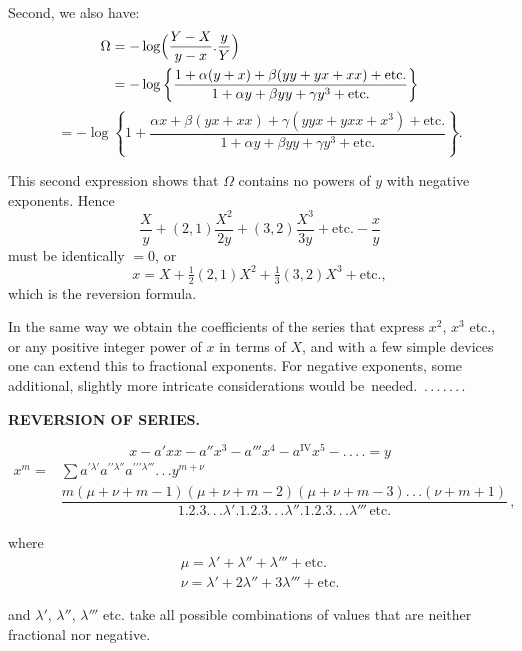\noindent\hspace*{\parindent}Second, we also have:
\[
\begin{aligned}\Omega &=-\log\Bigl(\dfrac{Y-X}{y-x} . \dfrac{y}{Y}\Bigr)\\ &=-\log\left\{\dfrac{1+\alpha(y+x)+\beta(yy+yx+xx)+\text{etc.}}{1+\alpha y+\beta yy+\gamma y^3+\text{etc.}}\right\}
\end{aligned}
\]
\[
=-\log\left\{1+\dfrac{\alpha x+\beta(yx+xx)+\gamma(yyx+yxx+x^3)+\text{etc.}}{1+\alpha y+\beta yy+\gamma y^3+\text{etc.}}\right\}.
\]

\noindent\hspace*{\parindent}This second expression shows that $\Omega$ contains no powers of $y$ with
negative exponents. Hence
\[
\dfrac{X}{y}+(2,1)\dfrac{X^2}{2y}+(3,2)\dfrac{X^3}{3y}+\text{etc.}-\dfrac{x}{y}
\]
\noindent must be identically $=0$, or
\[
x=X+\tfrac{1}{2}(2,1)X^2+\tfrac{1}{3}(3,2)X^3+\text{etc.},
\]
\noindent which is the reversion formula.

In the same way we obtain the coefficients of the series that express $x^2$, $x^3$ etc., or any positive integer
power of $x$ in terms of $X$, and with a few simple devices one can extend this to fractional
exponents. For negative exponents, some additional, slightly more intricate considerations would
\mbox{be needed. .\,.\,.\,.\,.\,.\,.}



\begin{center}
\textbf{REVERSION OF SERIES.}
\end{center}

\[
x-a'xx-a''x^3-a'''x^4-a^{\mathrm{IV}}x^5-.\,.\,.\,.=y
\]
\[
\begin{aligned}x^m={}&\sum a^{\prime\lambda'}a^{\prime\prime\lambda''}a^{\prime\prime\prime\lambda'''}.\,.\,. y^{m+\nu}\,\\
&\dfrac{m(\mu+\nu+m-1)(\mu+\nu+m-2)(\mu+\nu+m-3).\,.\,.(\nu+m+1)}
{1.2.3.\,.\,.\lambda'.1.2.3.\,.\,.\lambda''.1.2.3.\,.\,.\lambda'''\,\text{etc.}}\,,
\end{aligned}
\]

\noindent where
\[
\begin{array}{l}
\mu=\lambda'+\lambda''+\lambda'''+\text{etc.}\\[4pt]
\nu=\lambda'+2\lambda''+3\lambda'''+\text{etc.}
\end{array}
\]

\noindent and $\lambda'$, $\lambda''$, $\lambda'''$ etc. take all possible combinations of values
that are neither fractional nor negative.

